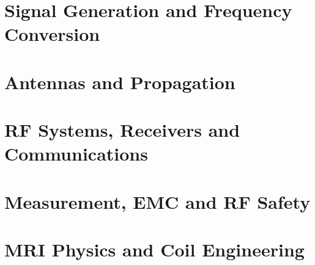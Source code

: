 \chapter{Signal Generation and Frequency Conversion}










\chapter{Antennas and Propagation}











\chapter{RF Systems, Receivers and Communications}















\chapter{Measurement, EMC and RF Safety}






\chapter{MRI Physics and Coil Engineering}
















